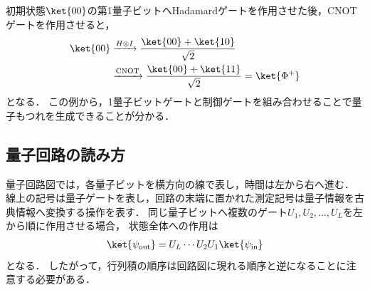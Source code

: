 初期状態$\ket{00}$の第1量子ビットへHadamardゲートを作用させた後，CNOTゲートを作用させると，
\begin{align*}
  \ket{00}
  &\xrightarrow{H\otimes I}
  \frac{\ket{00}+\ket{10}}{\sqrt{2}} \\
  &\xrightarrow{\mathrm{CNOT}}
  \frac{\ket{00}+\ket{11}}{\sqrt{2}}
  =\ket{\Phi^+}
\end{align*}
となる．
この例から，1量子ビットゲートと制御ゲートを組み合わせることで量子もつれを生成できることが分かる．

\subsection{量子回路の読み方}
\label{subsec:quantum-circuit-notation}

量子回路図では，各量子ビットを横方向の線で表し，時間は左から右へ進む．
線上の記号は量子ゲートを表し，回路の末端に置かれた測定記号は量子情報を古典情報へ変換する操作を表す．
同じ量子ビットへ複数のゲート$U_1,U_2,\ldots,U_L$を左から順に作用させる場合，
状態全体への作用は
\begin{align*}
  \ket{\psi_{\mathrm{out}}}
  =
  U_L\cdots U_2U_1\ket{\psi_{\mathrm{in}}}
\end{align*}
となる．
したがって，行列積の順序は回路図に現れる順序と逆になることに注意する必要がある．
